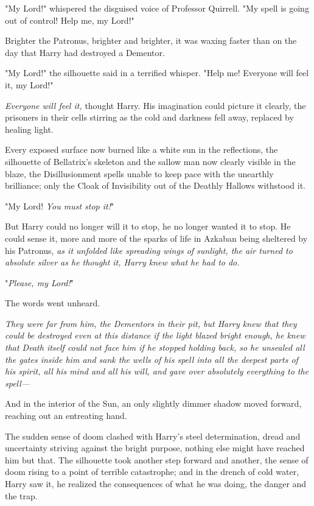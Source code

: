 "My Lord!" whispered the disguised voice of Professor Quirrell. "My spell is
going out of control! Help me, my Lord!"

Brighter the Patronus, brighter and brighter, it was waxing faster than on the
day that Harry had destroyed a Dementor.

"My Lord!" the silhouette said in a terrified whisper. "Help me! Everyone will
feel it, my Lord!"

\emph{Everyone will feel it,} thought Harry. His imagination could picture it
clearly, the prisoners in their cells stirring as the cold and darkness fell
away, replaced by healing light.

Every exposed surface now burned like a white sun in the reflections, the
silhouette of Bellatrix's skeleton and the sallow man now clearly visible in
the blaze, the Disillusionment spells unable to keep pace with the unearthly
brilliance; only the Cloak of Invisibility out of the Deathly Hallows withstood
it.

"My Lord! \emph{You must stop it!}"

But Harry could no longer will it to stop, he no longer wanted it to stop. He
could sense it, more and more of the sparks of life in Azkaban being sheltered
by his Patronus, \emph{as it unfolded like spreading wings of sunlight, the air
turned to absolute silver as he thought it, Harry knew what he had to do.}

"\emph{Please, my Lord!}"

The words went unheard.

\emph{They were far from him, the Dementors in their pit, but Harry knew that
they could be destroyed even at this distance if the light blazed bright
enough, he knew that Death itself could not face him if he stopped holding
back, so he unsealed all the gates inside him and sank the wells of his spell
into all the deepest parts of his spirit, all his mind and all his will, and
gave over absolutely everything to the spell---}

And in the interior of the Sun, an only slightly dimmer shadow moved forward,
reaching out an entreating hand.

\begin{thought}
\end{thought}

The sudden sense of doom clashed with Harry's steel determination, dread and
uncertainty striving against the bright purpose, nothing else might have
reached him but that. The silhouette took another step forward and another, the
sense of doom rising to a point of terrible catastrophe; and in the drench of
cold water, Harry saw it, he realized the consequences of what he was doing,
the danger and the trap.


